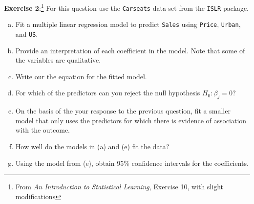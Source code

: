 \documentclass[11pt]{article}\usepackage[]{graphicx}\usepackage[]{color}
\begin{document}
\textbf{Exercise 2}:\footnote{From \emph{An Introduction to Statistical Learning}, Exercise 10, with slight modifications}  For this question use the \texttt{Carseats} data set from the \texttt{ISLR} package.
\begin{enumerate}[(a)]
\item Fit a multiple linear regression model to predict \texttt{Sales} using \texttt{Price}, \texttt{Urban}, and \texttt{US}.
\item Provide an interpretation of each coefficient in the model.  Note that some of the variables are qualitative.
\item Write our the equation for the fitted model.
\item For which of the predictors can you reject the null hypothesis $H_0: \beta_j = 0$?
\item On the basis of the your response to the previous question, fit a smaller model that only uses the predictors for which there is evidence of association with the outcome.
\item How well do the models in (a) and (e) fit the data?
\item Using the model from (e), obtain 95\% confidence intervals for the coefficients.
\end{enumerate}
\end{document}
